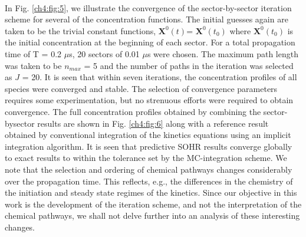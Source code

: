 \paragraph{}
In Fig. \ref{ch4:fig:5}, we illustrate the convergence of the sector-by-sector
iteration scheme for several of the concentration
functions. The initial guesses again are taken to be the trivial
constant functions, ${\textbf{X}}^0(t)$= ${\textbf{X}}^0(t_0)$ where ${\textbf{X}}^0(t_0)$ is the initial
concentration at the beginning of each sector. For a total
propagation time of T = 0.2 $\mu$s, 20 sectors of 0.01 $\mu$s were
chosen. The maximum path length was taken to be $n_{max}$ = 5 and
the number of paths in the iteration was selected as $J$ = 20. It is
seen that within seven iterations, the concentration profiles of
all species were converged and stable. The selection of
convergence parameters requires some experimentation, but
no strenuous efforts were required to obtain convergence. The
full concentration profiles obtained by combining the sector-bysector
results are shown in Fig. \ref{ch4:fig:6} along with a reference
result obtained by conventional integration of the kinetics
equations using an implicit integration algorithm. It is seen that
predictive SOHR results converge globally to exact results to within the tolerance set by the MC-integration scheme. We
note that the selection and ordering of chemical pathways
changes considerably over the propagation time. This reflects, e.g., the differences in the chemistry of the initiation and steady
state regimes of the kinetics. Since our objective in this work is
the development of the iteration scheme, and not the
interpretation of the chemical pathways, we shall not delve
further into an analysis of these interesting changes.
